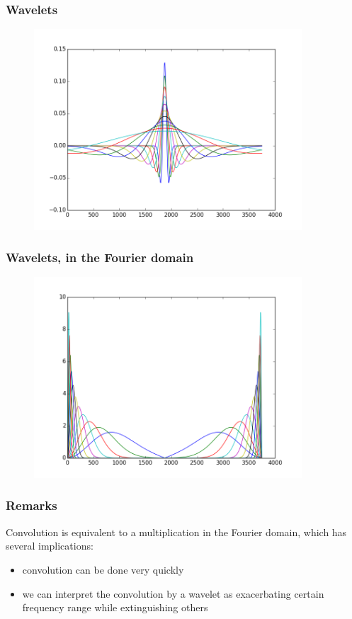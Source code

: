 \documentclass{beamer}
\begin{document}
\begin{frame}
	\frametitle{Wavelets}
	\begin{figure}
		\centering
		\includegraphics[width=10cm]{../half_wavelets.png}
	\end{figure}
\end{frame}

\begin{frame}
	\frametitle{Wavelets, in the Fourier domain}
	\begin{figure}
		\centering
		\includegraphics[width=10cm]{../half_wavelets_fft.png}
	\end{figure}
\end{frame}

\begin{frame}
	\frametitle{Remarks}
	Convolution is equivalent to a multiplication in the Fourier domain, which has several implications:
	\begin{itemize}
		\item convolution can be done very quickly
		\item we can interpret the convolution by a wavelet as exacerbating certain frequency range while extinguishing others
	\end{itemize}
\end{frame}
\end{document}
